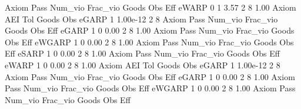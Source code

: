 {\smallskip}
{\smallskip}
{\smallskip}
       Axiom {\VBAR} Pass     Num_vio    Frac_vio       Goods         Obs         Eff  
       eWARP {\VBAR}    0           1        3.57           2           8        1.00  
{\smallskip}
       Axiom {\VBAR}       AEI        Tol      Goods        Obs 
       eGARP {\VBAR}         1   1.00e-12          2          8 
{\smallskip}
{\smallskip}
{\smallskip}
       Axiom {\VBAR} Pass     Num_vio    Frac_vio       Goods         Obs         Eff  
       eGARP {\VBAR}    1           0        0.00           2           8        1.00  
{\smallskip}
{\smallskip}
{\smallskip}
       Axiom {\VBAR} Pass     Num_vio    Frac_vio       Goods         Obs         Eff  
      eWGARP {\VBAR}    1           0        0.00           2           8        1.00  
{\smallskip}
{\smallskip}
{\smallskip}
       Axiom {\VBAR} Pass     Num_vio    Frac_vio       Goods         Obs         Eff  
       eSARP {\VBAR}    1           0        0.00           2           8        1.00  
{\smallskip}
{\smallskip}
{\smallskip}
       Axiom {\VBAR} Pass     Num_vio    Frac_vio       Goods         Obs         Eff  
       eWARP {\VBAR}    1           0        0.00           2           8        1.00  
{\smallskip}
       Axiom {\VBAR}       AEI        Tol      Goods        Obs 
       eGARP {\VBAR}         1   1.00e-12          2          8 
{\smallskip}
{\smallskip}
{\smallskip}
       Axiom {\VBAR} Pass     Num_vio    Frac_vio       Goods         Obs         Eff  
       eGARP {\VBAR}    1           0        0.00           2           8        1.00  
{\smallskip}
{\smallskip}
{\smallskip}
       Axiom {\VBAR} Pass     Num_vio    Frac_vio       Goods         Obs         Eff  
      eWGARP {\VBAR}    1           0        0.00           2           8        1.00  
{\smallskip}
{\smallskip}
{\smallskip}
       Axiom {\VBAR} Pass     Num_vio    Frac_vio       Goods         Obs         Eff  

